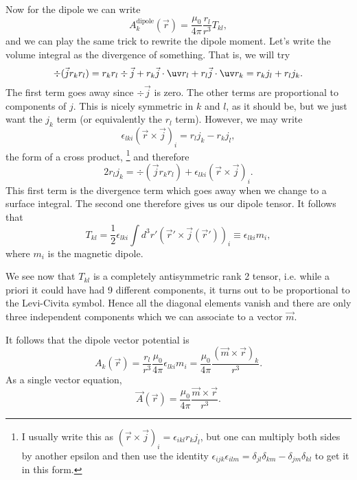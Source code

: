 Now for the dipole we can write
\begin{equation}
    A^\text{dipole}_k(\vec r) = \frac{\mu_0}{4\pi} \frac{r_l}{r^3} T_{kl},
\end{equation}
and we can play the same trick to rewrite the dipole moment. Let's write the volume integral as the divergence of something. That is, we will try
\begin{equation}
    \div(\vec j r_k r_l) = r_k r_l \div \vec j + r_k \vec j \cdot \uv r_l + r_l \vec j \cdot \uv r_k = r_k j_l + r_l j_k.
\end{equation}
The first term goes away since $\div \vec j$ is zero. The other terms are proportional to components of $j$. This is nicely symmetric in $k$ and $l$, as it should be, but we just want the $j_k$ term (or equivalently the $r_l$ term). However, we may write
\begin{equation}
    \epsilon_{lki}(\vec r \times \vec j)_i = r_l j_k - r_k j_l,
\end{equation}
the form of a cross product,%
    \footnote{I usually write this as $(\vec r \times \vec j)_i =\epsilon_{ikl}r_k j_l$, but one can multiply both sides by another epsilon and then use the identity $\epsilon_{ijk}\epsilon_{ilm} = \delta_{jl}\delta_{km}-\delta_{jm}\delta_{kl}$ to get it in this form.}
and therefore
\begin{equation}
    2r_l j_k = \div (\vec j r_k r_l) + \epsilon_{lki}(\vec r \times \vec j)_i.
\end{equation}
This first term is the divergence term which goes away when we change to a surface integral. The second one therefore gives us our dipole tensor. It follows that
\begin{equation}
    T_{kl} = \frac{1}{2} \epsilon_{lki} \int d^3 r'( \vec r' \times \vec j(\vec r'))_i \equiv \epsilon_{lki} m_i,
\end{equation}
where $m_i$ is the magnetic dipole.

We see now that $T_{kl}$ is a completely antisymmetric rank 2 tensor, i.e. while a priori it could have had 9 different components, it turns out to be proportional to the Levi-Civita symbol. Hence all the diagonal elements vanish and there are only three independent components which we can associate to a vector $\vec m$.

It follows that the dipole vector potential is
\begin{equation}
    A_k(\vec r) = \frac{r_l}{r^3} \frac{\mu_0}{4\pi} \epsilon_{lki} m_i = \frac{\mu_0}{4\pi} \frac{(\vec m \times \vec r)_k}{r^3}.
\end{equation}
As a single vector equation,
\begin{equation}
    \boxed{\vec A(\vec r) = \frac{\mu_0}{4\pi} \frac{\vec m \times \vec r}{r^3}.}
\end{equation}

